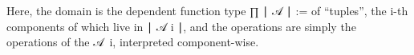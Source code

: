 \documentclass[a4paper,UKenglish,cleveref,autoref,thm-restate]{lipics-v2021}
\begin{document}
\begin{code}%
\>[1]\AgdaSpace{}%
\AgdaSymbol{:}\AgdaSpace{}%
\AgdaSymbol{\{}\AgdaSpace{}%
\AgdaSymbol{:}\AgdaSpace{}%
\AgdaSymbol{\}\{}\AgdaSpace{}%
\AgdaSymbol{:}\AgdaSpace{}%
\AgdaSpace{}%
\AgdaSpace{}%
\AgdaSymbol{\}(}\AgdaSpace{}%
\AgdaSymbol{:}\AgdaSpace{}%
\AgdaSpace{}%
\AgdaSpace{}%
\AgdaSpace{}%
\AgdaSpace{}%
\AgdaSpace{}%
\AgdaSymbol{)}\AgdaSpace{}%
\AgdaSpace{}%
\AgdaSpace{}%
\AgdaSymbol{(}\AgdaSpace{}%
\AgdaSpace{}%
\AgdaSymbol{)}\AgdaSpace{}%
\<%
\\
%
\>[1]\AgdaSpace{}%
\AgdaSymbol{\{}\AgdaSymbol{\}\{}\AgdaSymbol{\}}\AgdaSpace{}%
\AgdaSpace{}%
\AgdaSymbol{=}\<%
\\
\>[1][@{}l@{\AgdaIndent{0}}]%
\>[2]\AgdaSymbol{((}\AgdaSpace{}%
\AgdaSymbol{:}\AgdaSpace{}%
\AgdaSymbol{)}\AgdaSpace{}%
\AgdaSpace{}%
\AgdaSpace{}%
\AgdaSpace{}%
\AgdaSpace{}%
\AgdaSymbol{)}\AgdaSpace{}%
\AgdaOperator{\AgdaInductiveConstructor{,}}\AgdaSpace{}%
\AgdaSpace{}%
\AgdaSymbol{:}\AgdaSpace{}%
\AgdaSpace{}%
\AgdaSpace{}%
\AgdaSymbol{)(}\AgdaSpace{}%
\AgdaSymbol{:}\AgdaSpace{}%
\AgdaSpace{}%
\AgdaSpace{}%
\AgdaSpace{}%
\AgdaSpace{}%
\AgdaSpace{}%
\AgdaSymbol{(}\AgdaSpace{}%
\AgdaSymbol{:}\AgdaSpace{}%
\AgdaSymbol{)}\AgdaSpace{}%
\AgdaSpace{}%
\AgdaSpace{}%
\AgdaSpace{}%
\AgdaSpace{}%
\AgdaSymbol{)(}\AgdaSpace{}%
\AgdaSymbol{:}\AgdaSpace{}%
\AgdaSymbol{)}\AgdaSpace{}%
\AgdaSpace{}%
\AgdaSymbol{(}\AgdaSpace{}%
\AgdaSpace{}%
\AgdaSpace{}%
\AgdaSymbol{)}\AgdaSpace{}%
\AgdaSpace{}%
\AgdaSpace{}%
\AgdaSpace{}%
\AgdaSpace{}%
\AgdaSymbol{\}}\<%
\end{code}
\ccpad
Here, the domain is the dependent function type
\af ∏ \af ∣ \ab 𝒜 \af ∣ := \AgdaSymbol{(}\AgdaSpace{}\AgdaSymbol{:}\AgdaSpace{}\AgdaSymbol{)}\AgdaSpace{}\AgdaSpace{}\AgdaSpace{}\AgdaSpace{}\AgdaSpace{}
of ``tuples'', the \ab i-th components of which live in \af ∣ \ab 𝒜 \ab i \af ∣, and the operations are simply the operations of the \ab 𝒜~\ab i, interpreted component-wise.
\end{document}
